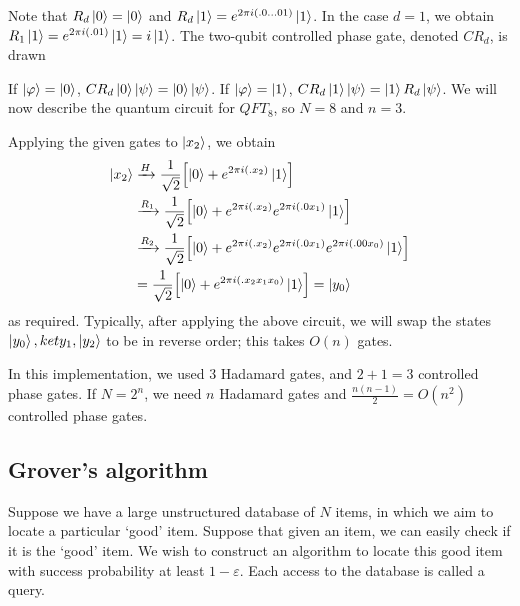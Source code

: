 Note that \( R_d \ket{0} = \ket{0} \) and \( R_d \ket{1} = e^{2\pi i(.0\dots 01)} \ket{1} \).
In the case \( d = 1 \), we obtain \( R_1 \ket{1} = e^{2 \pi i(.01)} \ket{1} = i \ket{1} \).
The two-qubit controlled phase gate, denoted \( CR_d \), is drawn
\begin{center}
    \leavevmode
\end{center}
If \( \ket{\varphi} = \ket{0} \), \( CR_d\ket{0}\ket{\psi} = \ket{0}\ket{\psi} \).
If \( \ket{\varphi} = \ket{1} \), \( CR_d\ket{1}\ket{\psi} = \ket{1}R_d\ket{\psi} \).
We will now describe the quantum circuit for \( QFT_8 \), so \( N = 8 \) and \( n = 3 \).
\begin{center}
    \leavevmode
\end{center}
Applying the given gates to \( \ket{x_2} \), we obtain
\begin{align*}
    \ket{x_2} &\xrightarrow{H} \frac{1}{\sqrt{2}}\qty[\ket{0} + e^{2\pi i (.x_2)} \ket{1}] \\
    &\xrightarrow{R_1} \frac{1}{\sqrt{2}}\qty[\ket{0} + e^{2\pi i (.x_2)} e^{2\pi i(.0x_1)} \ket{1}] \\
    &\xrightarrow{R_2} \frac{1}{\sqrt{2}}\qty[\ket{0} + e^{2\pi i(.x_2)} e^{2\pi i(.0x_1)} e^{2\pi i(.00x_0)} \ket{1}] \\
    &= \frac{1}{\sqrt{2}}\qty[\ket{0} + e^{2\pi i(.x_2 x_1 x_0)} \ket{1}] = \ket{y_0}
\end{align*}
as required.
Typically, after applying the above circuit, we will swap the states \( \ket{y_0}, ket{y_1}, \ket{y_2} \) to be in reverse order; this takes \( O(n) \) gates.

In this implementation, we used 3 Hadamard gates, and \( 2 + 1 = 3 \) controlled phase gates.
If \( N = 2^n \), we need \( n \) Hadamard gates and \( \frac{n(n-1)}{2} = O(n^2) \) controlled phase gates.

\subsection{Grover's algorithm}
Suppose we have a large unstructured database of \( N \) items, in which we aim to locate a particular `good' item.
Suppose that given an item, we can easily check if it is the `good' item.
We wish to construct an algorithm to locate this good item with success probability at least \( 1 - \varepsilon \).
Each access to the database is called a query.

